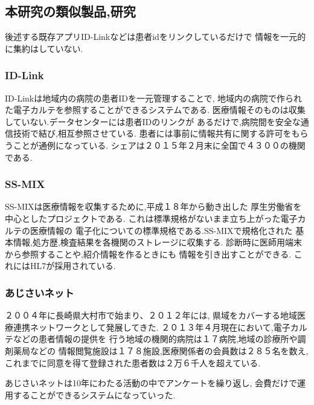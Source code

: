\subsection{本研究の類似製品,研究}
  後述する既存アプリID-Linkなどは患者idをリンクしているだけで
  情報を一元的に集約はしていない.

  \subsubsection{ID-Link}
    ID-Linkは地域内の病院の患者IDを一元管理することで,
    地域内の病院で作られた電子カルテを参照することができるシステムである.
    医療情報そのものは収集していない.データセンターには患者IDのリンクが
    あるだけで,病院間を安全な通信技術で結び,相互参照させている.
    患者には事前に情報共有に関する許可をもらうことが通例になっている.
    シェアは２０１５年２月末に全国で４３００の機関である.

  \subsubsection{SS-MIX} \cite{bibi7}
    SS-MIXは医療情報を収集するために,平成１８年から動き出した
    厚生労働省を中心としたプロジェクトである.
    これは標準規格がないまま立ち上がった電子カルテの医療情報の
    電子化についての標準規格である.SS-MIXで規格化された
    基本情報,処方歴,検査結果を各機関のストレージに収集する.
    診断時に医師用端末から参照することや,紹介情報を作るときにも
    情報を引き出すことができる.
    これにはHL7が採用されている.

  \subsubsection{あじさいネット}\cite{bibi3}
    ２００４年に長崎県大村市で始まり、２０１２年には,
    県域をカバーする地域医療連携ネットワークとして発展してきた.
    ２０１３年４月現在において,電子カルテなどの患者情報の提供を
    行う地域の機関的病院は１７病院,地域の診療所や調剤薬局などの
    情報閲覧施設は１７８施設,医療関係者の会員数は２８５名を数え,
    これまでに同意を得て登録された患者数は２万６千人を超えている.

    あじさいネットは10年にわたる活動の中でアンケートを繰り返し,
    会費だけで運用することができるシステムになっていった.
